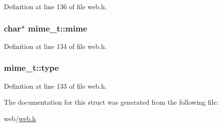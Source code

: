 Definition at line 136 of file web.\+h.

\subsubsection[{\texorpdfstring{mime}{mime}}]{\setlength{\rightskip}{0pt plus 5cm}char$\ast$ mime\+\_\+t\+::mime}\hypertarget{structmime__t_ad796d16eaee60d7435bff66b2e9b8a8d}{}\label{structmime__t_ad796d16eaee60d7435bff66b2e9b8a8d}


Definition at line 134 of file web.\+h.

\subsubsection[{\texorpdfstring{type}{type}}]{ mime\+\_\+t\+::type}\hypertarget{structmime__t_ae69826dcfd475d65fa0fe8a1574bb3af}{}\label{structmime__t_ae69826dcfd475d65fa0fe8a1574bb3af}


Definition at line 133 of file web.\+h.



The documentation for this struct was generated from the following file\+:\begin{DoxyCompactItemize}
\item 
web/\hyperlink{web_8h}{web.\+h}\end{DoxyCompactItemize}
